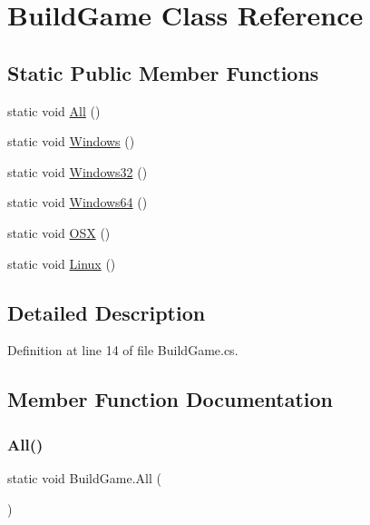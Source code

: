 \hypertarget{class_build_game}{}\section{Build\+Game Class Reference}
\label{class_build_game}
\subsection*{Static Public Member Functions}
\begin{DoxyCompactItemize}
\item 
static void \hyperlink{class_build_game_a357080fa7071c887d3c259b2b01e8110}{All} ()
\item 
static void \hyperlink{class_build_game_aed199035998eb614dd0da727347020ab}{Windows} ()
\item 
static void \hyperlink{class_build_game_a12fefacae88f1bc407405e555f52e209}{Windows32} ()
\item 
static void \hyperlink{class_build_game_ab49112148581bede60d4e424f9778de2}{Windows64} ()
\item 
static void \hyperlink{class_build_game_afe7eb06749c1c0bf09cb98d95ef1a4e7}{O\+SX} ()
\item 
static void \hyperlink{class_build_game_a15a2ab2ef00e658f9ba55c4a76385a20}{Linux} ()
\end{DoxyCompactItemize}


\subsection{Detailed Description}


Definition at line 14 of file Build\+Game.\+cs.



\subsection{Member Function Documentation}
\mbox{\label{class_build_game_a357080fa7071c887d3c259b2b01e8110}} 
\subsubsection{\texorpdfstring{All()}{All()}}
{\footnotesize\ttfamily static void Build\+Game.\+All (\begin{DoxyParamCaption}{ }\end{DoxyParamCaption})\hspace{0.3cm}{\ttfamily [static]}}



